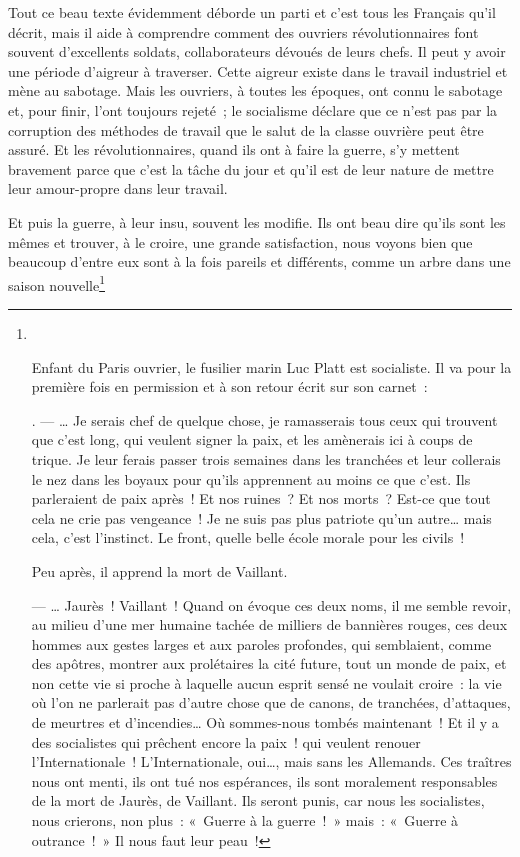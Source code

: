 \documentclass[french,twoside]{book} %
\begin{document}
\noindent Tout ce beau texte évidemment déborde un parti et c’est tous les Français qu’il décrit, mais il aide à comprendre comment des ouvriers révolutionnaires font souvent d’excellents soldats, collaborateurs dévoués de leurs chefs. Il peut y avoir une période d’aigreur à traverser. Cette aigreur existe dans le travail industriel et mène au sabotage. Mais les ouvriers, à toutes les époques, ont connu le sabotage et, pour finir, l’ont toujours rejeté ; le socialisme déclare que ce n’est pas par la corruption des méthodes de travail que le salut de la classe ouvrière peut être assuré. Et les révolutionnaires, quand ils ont à faire la guerre, s’y mettent bravement parce que c’est la tâche du jour et qu’il est de leur nature de mettre leur amour-propre dans leur travail.‌\par
Et puis la guerre, à leur insu, souvent les modifie. Ils ont beau dire qu’ils sont les mêmes et trouver, à le croire, une grande satisfaction, nous voyons bien que beaucoup d’entre eux sont à la fois pareils et différents, comme un arbre dans une saison nouvelle\footnote{‌\par
 Enfant du Paris ouvrier, le fusilier marin Luc Platt est socialiste. Il va pour la première fois en permission et à son retour écrit sur son carnet :‌\par
  . — … Je serais chef de quelque chose, je ramasserais tous ceux qui trouvent que c’est long, qui veulent signer la paix, et les amènerais ici à coups de trique. Je leur ferais passer trois semaines dans les tranchées et leur collerais le nez dans les boyaux pour qu’ils apprennent au moins ce que c’est. Ils parleraient de paix après ! Et nos ruines ? Et nos morts ? Est-ce que tout cela ne crie pas vengeance ! Je ne suis pas plus patriote qu’un autre… mais cela, c’est l’instinct. Le front, quelle belle école morale pour les civils !‌
 \par
\noindent Peu après, il apprend la mort de Vaillant.‌\par
   — … Jaurès ! Vaillant ! Quand on évoque ces deux noms, il me semble revoir, au milieu d’une mer humaine tachée de milliers de bannières rouges, ces deux hommes aux gestes larges et aux paroles profondes, qui semblaient, comme des apôtres, montrer aux prolétaires la cité future, tout un monde de paix, et non cette vie si proche à laquelle aucun esprit sensé ne voulait croire : la vie où l’on ne parlerait pas d’autre chose que de canons, de tranchées, d’attaques, de meurtres et d’incendies… Où sommes-nous tombés maintenant ! Et il y a des socialistes qui prêchent encore la paix ! qui veulent renouer l’Internationale ! L’Internationale, oui…, mais sans les Allemands. Ces traîtres nous ont menti, ils ont tué nos espérances, ils sont moralement responsables de la mort de Jaurès, de Vaillant. Ils seront punis, car nous les socialistes, nous crierons, non plus : « Guerre à la guerre ! » mais : « Guerre à outrance ! » Il nous faut leur peau !‌\par
}
\end{document}
